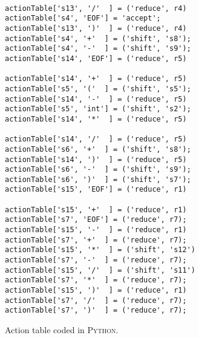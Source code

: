\begin{figure}[!ht]
\begin{Verbatim}
                                             actionTable['s13', '/'  ] = ('reduce', r4)   
actionTable['s4', 'EOF'] = 'accept';         actionTable['s13', ')'  ] = ('reduce', r4)   
actionTable['s4', '+'  ] = ('shift', 's8');                                               
actionTable['s4', '-'  ] = ('shift', 's9');  actionTable['s14', 'EOF'] = ('reduce', r5)   
                                             actionTable['s14', '+'  ] = ('reduce', r5)   
actionTable['s5', '('  ] = ('shift', 's5');  actionTable['s14', '-'  ] = ('reduce', r5)   
actionTable['s5', 'int'] = ('shift', 's2');  actionTable['s14', '*'  ] = ('reduce', r5)   
                                             actionTable['s14', '/'  ] = ('reduce', r5)   
actionTable['s6', '+'  ] = ('shift', 's8');  actionTable['s14', ')'  ] = ('reduce', r5)   
actionTable['s6', '-'  ] = ('shift', 's9');                                               
actionTable['s6', ')'  ] = ('shift', 's7');  actionTable['s15', 'EOF'] = ('reduce', r1)   
                                             actionTable['s15', '+'  ] = ('reduce', r1)   
actionTable['s7', 'EOF'] = ('reduce', r7);   actionTable['s15', '-'  ] = ('reduce', r1)   
actionTable['s7', '+'  ] = ('reduce', r7);   actionTable['s15', '*'  ] = ('shift', 's12') 
actionTable['s7', '-'  ] = ('reduce', r7);   actionTable['s15', '/'  ] = ('shift', 's11') 
actionTable['s7', '*'  ] = ('reduce', r7);   actionTable['s15', ')'  ] = ('reduce', r1)   
actionTable['s7', '/'  ] = ('reduce', r7);
actionTable['s7', ')'  ] = ('reduce', r7);
\end{Verbatim}
\vspace*{-0.3cm}
\caption{Action table coded in \textsc{Python}.}
\label{fig:parse-table.stlx:action}
\end{figure}





 
